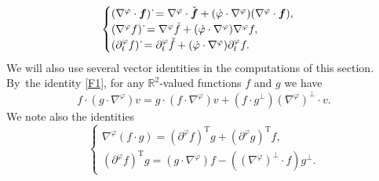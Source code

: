 \documentclass[JEP,XML,SOM,Unicode,NoFloatCountersInSection,published]{cedram}
\newcommand{\R}{{\mathbb R}}
\newcommand{\dt}{\partial_t}
\theoremstyle{definition}
\begin{document}
\begin{equation}\label{linearization 2}
\begin{cases}
(\nabla^\varphi \cdot \mbox{\boldmath$f$})\,\dot{}
= \nabla^\varphi \cdot \check{\mbox{\boldmath$f$}}
+ (\dot{\varphi} \cdot \nabla^\varphi)(\nabla^\varphi \cdot \mbox{\boldmath$f$}), \\
(\nabla^\varphi f)\,\dot{}
= \nabla^\varphi \check{f} + (\dot{\varphi} \cdot \nabla^\varphi)\nabla^\varphi f, \\
(\dt^\varphi f)\,\dot{}
= \dt^\varphi\check{f} + (\dot{\varphi} \cdot \nabla^\varphi)\dt^\varphi f.
\end{cases}
\end{equation}
We will also use several vector identities in the computations of this section. By~the identity \eqref{F1}, for any $\R^2$-valued functions $f$ and $g$ we have
\begin{equation}\label{F2}
f\cdot(g\cdot\nabla^\varphi)v = g\cdot(f\cdot\nabla^\varphi)v+(f\cdot g^\perp)(\nabla^\varphi)^\perp\cdot v.
\end{equation}
We note also the identities
\begin{equation}\label{F3}
\begin{cases}
\nabla^\varphi(f\cdot g) = (\partial^\varphi f)^\mathrm{T}g + (\partial^\varphi g)^\mathrm{T}f, \\
(\partial^\varphi f)^\mathrm{T}g = (g\cdot\nabla^\varphi)f - ((\nabla^\varphi)^\perp\cdot f)g^\perp.
\end{cases}
\end{equation}
\end{document}
